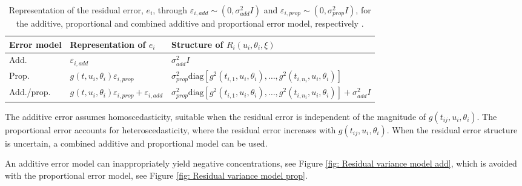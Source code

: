 \begin{table}[h]
\centering
\begin{tabular}{>{\raggedright\arraybackslash}p{} >{\raggedright\arraybackslash}p{} >{\raggedright\arraybackslash}p{}}
\toprule
\textbf{Error model} & \textbf{Representation of $e_i$} & \textbf{Structure of $R_i(u_i,\theta_i,\xi)$} \\
\midrule
Add. & $\varepsilon_{i,add}$ & $\sigma^2_{add}I$ \\
Prop. & $g(t, u_i, \theta_i)\varepsilon_{i,prop}$ & $\sigma_{prop}^2 \text{diag}[g^2(t_{i,1},u_i,\theta_i), \dots, g^2(t_{i,n_i},u_i,\theta_i)]$ \\
Add./prop. & $g(t, u_i, \theta_i)\varepsilon_{i,prop}+\varepsilon_{i,add}$ & $\sigma_{prop}^2 \text{diag}[g^2(t_{i,1},u_i,\theta_i), \dots, g^2(t_{i,n_i},u_i,\theta_i)] + \sigma^2_{add}I$ \\
\bottomrule
\end{tabular}
\caption{Representation of the residual error, $e_i$, through $\varepsilon_{i,add} \sim (0,\sigma^2_{add}I)$ and $\varepsilon_{i,prop} \sim (0,\sigma^2_{prop}I)$, for the additive, proportional and combined additive and proportional error model, respectively \citep[p. 236]{bonate}.}
\label{tab:error models}
\end{table}

The additive error assumes homoscedasticity, suitable when the residual error is independent of the magnitude of $g(t_{ij},u_i,\theta_i)$. The proportional error accounts for heteroscedasticity, where the residual error increases with $g(t_{ij},u_i,\theta_i)$. When the residual error structure is uncertain, a combined additive and proportional model can be used. 

An additive error model can inappropriately yield negative concentrations, see Figure \ref{fig: Residual variance model add}, which is avoided with the proportional error model, see Figure \ref{fig: Residual variance model prop}.





